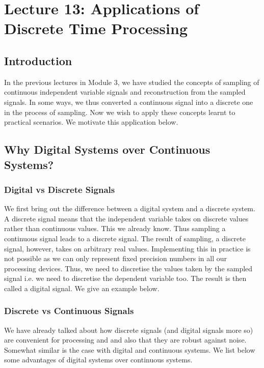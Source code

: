 \section{Lecture 13: Applications of Discrete Time Processing}


\subsection{Introduction}
In the previous lectures in Module 3, we have studied the concepts of sampling of continuous independent variable signals and reconstruction from the sampled signals. In some ways, we thus converted a continuous signal into a discrete one in the process of sampling. Now we wish to apply these concepts learnt to practical scenarios. We motivate this application below.

\subsection{Why Digital Systems over Continuous Systems?}
\subsubsection{Digital vs Discrete Signals}
We first bring out the difference between a digital system and a discrete system. A discrete signal means that the independent variable takes on discrete values rather than continuous values. This we already know. Thus sampling a continuous signal leads to a discrete signal. The result of sampling, a discrete signal, however, takes on arbitrary real values. Implementing this in practice is not possible as we can only represent fixed precision numbers in all our processing devices. Thus, we need to discretise the values taken by the sampled signal i.e. we need to discretise the dependent variable too. The result is then called a digital signal. We give an example below.


\subsubsection{Discrete vs Continuous Signals}
We have already talked about how discrete signals (and digital signals more so) are convenient for processing and and also that they are robust against noise. Somewhat similar is the case with digital and continuous systems. We list below some advantages of digital systems over continuous systems.

